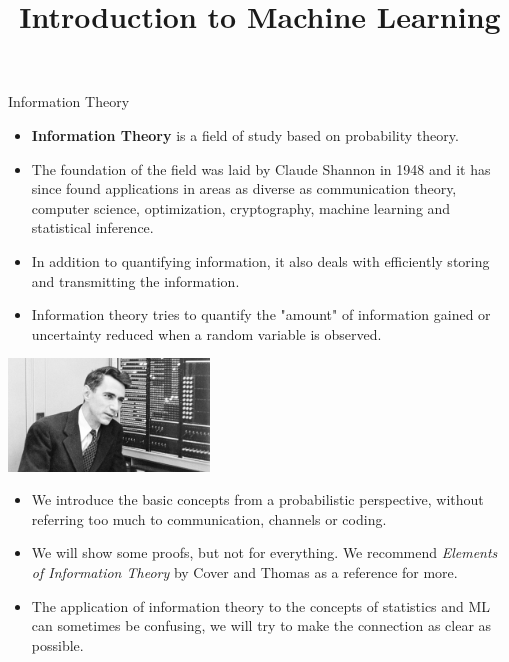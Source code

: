 \documentclass[11pt,compress,t,notes=noshow, xcolor=table]{beamer}
\title{Introduction to Machine Learning}
\date{}
\begin{document}


\begin{vbframe}{Information Theory}

\begin{itemize}
  \item \textbf{Information Theory} is a field of study based on probability theory.
  \item The foundation of the field was laid by Claude Shannon in 1948 and it has since found applications in areas as diverse as communication theory, computer science, optimization, cryptography, machine learning and statistical inference.
  \item In addition to quantifying information, it also deals with efficiently storing and transmitting the information.
  \item Information theory tries to quantify the "amount" of information gained or 
    uncertainty reduced when a random variable is observed.
\end{itemize}

  \begin{center}
\includegraphics[width = 0.4\textwidth]{figure_man/claude-shannon.jpg} \\
\end{center}

\framebreak

\lz
\begin{itemize}
\setlength\itemsep{1.2em}
  \item We introduce the basic concepts from a probabilistic perspective, without referring too much to communication, channels or coding.
  \item We will show some proofs, but not for everything. We recommend 
    \textit{Elements of Information Theory} by Cover and Thomas as a reference for more. 
  \item The application of information theory to the concepts of statistics and ML can sometimes be confusing, we will try to make the connection as clear as possible.
\end{itemize}
\end{vbframe}
\end{document}
